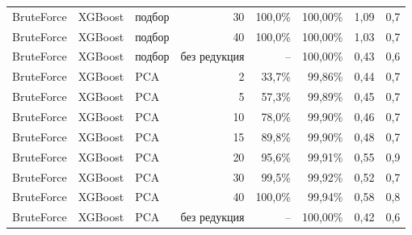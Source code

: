 {\begin{tabular}{@{}lllrrrrr@{}}
\rowcolor{rowalt}BruteForce & XGBoost & подбор & 30 & 100,0\% & 100,00\% & 1,09 & 0,7\\
BruteForce & XGBoost & подбор & 40 & 100,0\% & 100,00\% & 1,03 & 0,7\\
\rowcolor{rowalt}BruteForce & XGBoost & подбор & без редукция & -- & 100,00\% & 0,43 & 0,6\\
BruteForce & XGBoost & PCA & 2 & 33,7\% & 99,86\% & 0,44 & 0,7\\
\rowcolor{rowalt}BruteForce & XGBoost & PCA & 5 & 57,3\% & 99,89\% & 0,45 & 0,7\\
BruteForce & XGBoost & PCA & 10 & 78,0\% & 99,90\% & 0,46 & 0,7\\
\rowcolor{rowalt}BruteForce & XGBoost & PCA & 15 & 89,8\% & 99,90\% & 0,48 & 0,7\\
BruteForce & XGBoost & PCA & 20 & 95,6\% & 99,91\% & 0,55 & 0,9\\
\rowcolor{rowalt}BruteForce & XGBoost & PCA & 30 & 99,5\% & 99,92\% & 0,52 & 0,7\\
BruteForce & XGBoost & PCA & 40 & 100,0\% & 99,94\% & 0,58 & 0,8\\
\rowcolor{rowalt}BruteForce & XGBoost & PCA & без редукция & -- & 100,00\% & 0,42 & 0,6\\
\bottomrule
\end{tabular}}%

